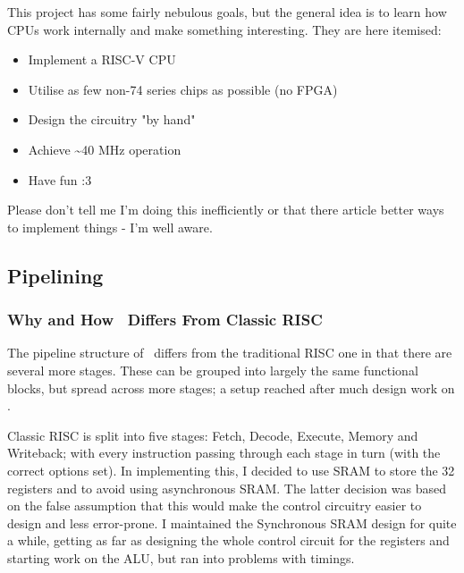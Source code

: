 \documentclass[a4paper, 11pt]{article}
\begin{document}
        This project has some fairly nebulous goals, but the general idea is
        to learn how CPUs work internally and make something interesting.
        They are here itemised:

        \begin{itemize}
            \item Implement a RISC-V CPU
            \item Utilise as few non-74 series chips as possible (no FPGA)
            \item Design the circuitry "by hand"
            \item Achieve \textasciitilde 40 MHz operation
            \item Have fun :3
        \end{itemize}

        Please don't tell me I'm doing this inefficiently or that there article
        better ways to implement things - I'm well aware.

        \subsection{Pipelining}\label{sec:Intro:Pipeline}

            \subsubsection{Why and How \logo\ Differs From Classic RISC}

            The pipeline structure of \logo\ differs from the traditional RISC
            one in that there are several more stages. These can be grouped
            into largely the same functional blocks, but spread across more
            stages; a setup reached after much design work on \oldlonglogo.

            Classic RISC is split into five stages: Fetch, Decode, Execute, Memory
            and Writeback; with every instruction passing through each stage
            in turn (with the correct options set). 
            In implementing this, I decided to use SRAM to store the 32 registers 
            and to avoid using asynchronous SRAM. 
            The latter decision was based on the false assumption that this 
            would make the control circuitry easier to design and less error-prone.
            I maintained the Synchronous SRAM design for quite a while, getting
            as far as designing the whole control circuit for the registers
            and starting work on the ALU, but ran into problems with timings.
\end{document}
